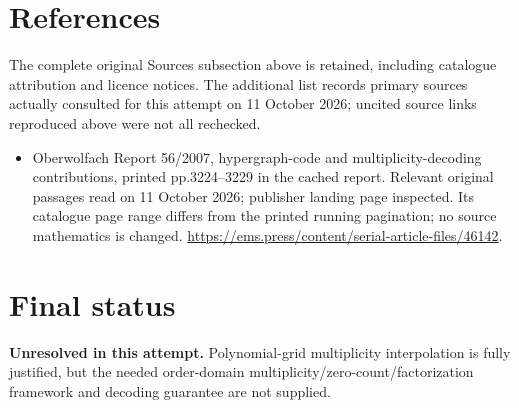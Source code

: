 \documentclass[11pt]{article}
\begin{document}
\section{References}
The complete original Sources subsection above is retained, including catalogue attribution and licence notices. The additional list records primary sources actually consulted for this attempt on 11 October 2026; uncited source links reproduced above were not all rechecked.
\begin{itemize}
\item Oberwolfach Report 56/2007, hypergraph-code and multiplicity-decoding contributions, printed pp.3224--3229 in the cached report. Relevant original passages read on 11 October 2026; publisher landing page inspected. Its catalogue page range differs from the printed running pagination; no source mathematics is changed. \url{https://ems.press/content/serial-article-files/46142}.
\end{itemize}
\section{Final status}
\textbf{Unresolved in this attempt.} Polynomial-grid multiplicity interpolation is fully justified, but the needed order-domain multiplicity/zero-count/factorization framework and decoding guarantee are not supplied.
\end{document}
